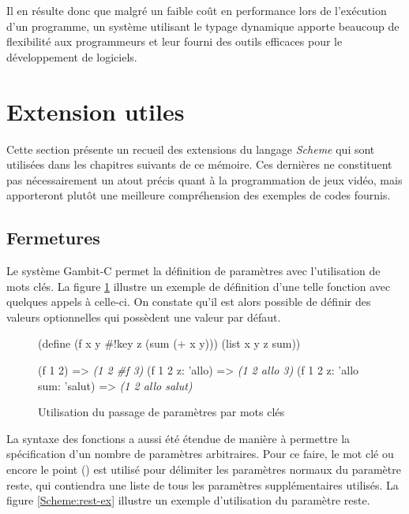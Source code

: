 \documentclass[12pt,twoside,letterpaper,francais]{book}
\newcommand{\Schemelang}{{\textit{Scheme }}}
\newcommand{\scheme}[1]{\selectlanguage{english}{\tt #1}\selectlanguage{french}}
\newcommand{\schemeresult}[1]{{\it #1}}
\begin{document}
Il en résulte donc que malgré un faible coût en performance lors de
l'exécution d'un programme, un système utilisant le typage dynamique
apporte beaucoup de flexibilité aux programmeurs et leur fourni des
outils efficaces pour le développement de logiciels.



\FloatBarrier
\section{Extension utiles}
Cette section présente un recueil des extensions du langage
\Schemelang qui sont utilisées dans les chapitres suivants de ce
mémoire. Ces dernières ne constituent pas nécessairement un atout
précis quant à la programmation de jeux vidéo, mais apporteront plutôt
une meilleure compréhension des exemples de codes fournis.


\FloatBarrier
\subsection{Fermetures}
Le système Gambit-C permet la définition de paramètres avec
l'utilisation de mots clés. La figure \ref{Scheme:fun-key} illustre un
exemple de définition d'une telle fonction avec quelques appels à
celle-ci. On constate qu'il est alors possible de définir des valeurs
optionnelles qui possèdent une valeur par défaut.\\

\begin{figure}[htb!]
  \begin{schemecode}
(define (f x y \#!key z (sum (+ x y)))
  (list x y z sum))

(f 1 2)                      => \schemeresult{(1 2 \#f 3)}
(f 1 2 z: 'allo)             => \schemeresult{(1 2 allo 3)}
(f 1 2 z: 'allo sum: 'salut) => \schemeresult{(1 2 allo salut)}
  \end{schemecode}
  \caption{Utilisation du passage de paramètres par mots clés}
  \label{Scheme:fun-key}
\end{figure}

La syntaxe des fonctions a aussi été étendue de manière à permettre la
spécification d'un nombre de paramètres arbitraires. Pour ce faire, le
mot clé \scheme{\#!rest} ou encore le point (\scheme{.}) est utilisé
pour délimiter les paramètres normaux du paramètre reste, qui
contiendra une liste de tous les paramètres supplémentaires
utilisés. La figure \ref{Scheme:rest-ex} illustre un exemple
d'utilisation du paramètre reste.\\
\end{document}
